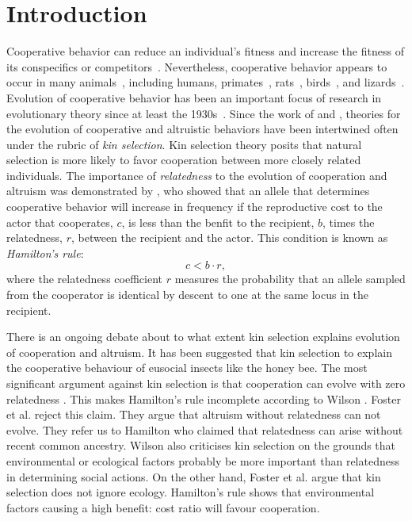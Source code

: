 \documentclass[12pt]{extarticle}
\begin{document}
\pagebreak

\tableofcontents
\pagebreak


\section{Introduction}
Cooperative behavior can reduce an individual's fitness and increase the fitness of its conspecifics or competitors~\citep{axelrod1981evolution}.
Nevertheless, cooperative behavior appears to occur in many animals~\citep{dugatkin1997cooperation}, including humans, primates~\citep{jaeggi2013natural},  rats~\citep{rice1962altruism}, birds~\citep{stacey1990cooperative,krams2008experimental}, and lizards~\citep{sinervo2006self}.
Evolution of cooperative behavior has been an important focus of research in evolutionary theory since at least the 1930s~\citep{Haldane1932book}.
Since the work of  \citet{hamilton1964genetical} and \citet{axelrod1981evolution}, theories for the evolution of cooperative and altruistic behaviors have been intertwined often under the rubric of \emph{kin selection}.
Kin selection theory posits that natural selection is more likely to favor cooperation between more closely related individuals.
The importance of \emph{relatedness} to the evolution of cooperation and altruism was demonstrated by \citet{hamilton1964genetical}, who showed that an allele that determines cooperative behavior will increase in frequency if the reproductive cost to the actor that cooperates, $c$, is less than the benfit to the recipient, $b$, times the relatedness, $r$, between the recipient and the actor.
This condition is  known as \emph{Hamilton's rule}:
\begin{equation} \label{eq:hamilton_rule}
c < b \cdot r,
\end{equation}
where the relatedness coefficient $r$ measures the probability that an allele sampled from the cooperator is identical by descent to one at the same locus in the recipient.

There is an ongoing debate about to what extent kin selection explains evolution of cooperation and altruism.
It has been suggested that kin selection to explain the cooperative behaviour of eusocial insects like the honey bee.
The most significant argument against kin selection is that cooperation can evolve with zero relatedness \cite{wilson2005kin}. This makes Hamilton's rule incomplete according to Wilson \cite{wilson2005kin}. Foster et al. \cite{foster2006kin} reject this claim. 
They argue that altruism without relatedness can not evolve. They refer us to Hamilton who claimed that relatedness can arise without recent common ancestry. 
Wilson also criticises kin selection on the grounds that environmental or ecological factors probably be more important than relatedness in determining social actions. On the other hand, Foster et al. \cite{foster2006kin} argue that kin selection does not ignore ecology. 
Hamilton’s rule shows that environmental factors causing a high benefit: cost ratio will favour cooperation.
\end{document}
